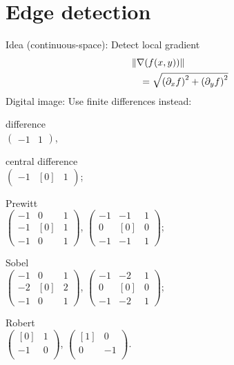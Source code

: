 \section{Edge detection}
	 Idea (continuous-space): Detect local gradient
		\begin{align*}
			&\left\lVert \nabla(f(x,y)) \right\rVert\\
			&\quad=\sqrt{\left( \partial_{x}f \right)^2+\left( \partial_{y}f \right)^2}
		\end{align*}
		Digital image: Use finite differences instead:\\
		\begin{enumerate*}[label=\protect\circled{\arabic*},itemjoin=]
			\item difference\\
				$\left(\begin{smallmatrix}
					-1&1
				\end{smallmatrix}\right)$,\\
			\item central difference\\
				$\left(\begin{smallmatrix}
					-1&[0]&1
				\end{smallmatrix}\right)$;\\
			\item Prewitt\\
				$\left(\begin{smallmatrix}
					-1&0&1\\
					-1&[0]&1\\
					-1&0&1
				\end{smallmatrix}\right)$,
				$\left(\begin{smallmatrix}
					-1&-1&1\\
					0&[0]&0\\
					-1&-1&1
				\end{smallmatrix}\right)$;\\
			\item Sobel\\
				$\left(\begin{smallmatrix}
					-1&0&1\\
					-2&[0]&2\\
					-1&0&1
				\end{smallmatrix}\right)$,
				$\left(\begin{smallmatrix}
					-1&-2&1\\
					0&[0]&0\\
					-1&-2&1
				\end{smallmatrix}\right)$;\\
			\item Robert\\
				$\left(\begin{smallmatrix}
					[0]&1\\
					-1&0\\
				\end{smallmatrix}\right)$,
				$\left(\begin{smallmatrix}
					[1]&0\\
					0&-1\\
				\end{smallmatrix}\right)$.
		\end{enumerate*}
